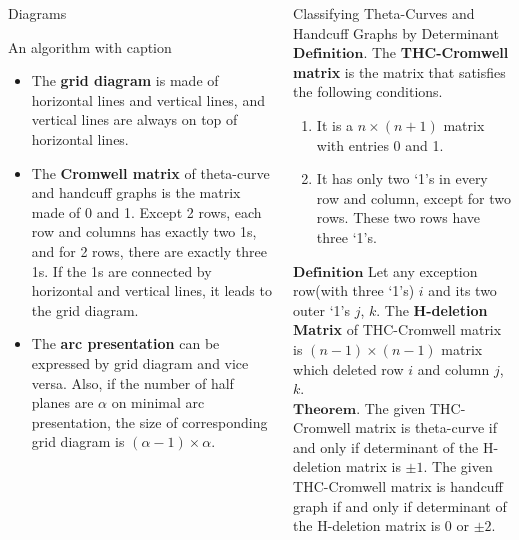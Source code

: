 \documentclass[final]{beamer}
\begin{document}
\begin{frame}[t]
\begin{columns}[t]
\begin{block}{Diagrams}
    \begin{Diagrams}
      \caption{An algorithm with caption}\label{alg:cap}
      \begin{itemize} 
        \item The \textbf{grid diagram} is made of horizontal lines and vertical lines, and vertical lines are always on top of horizontal lines.
        \item The \textbf{Cromwell matrix} of theta-curve and handcuff graphs is the matrix made of 0 and 1.
        Except 2 rows, each row and columns has exactly two 1s, and for 2 rows, there are exactly three 1s.
        If the 1s are connected by horizontal and vertical lines, it leads to the grid diagram.
        \item The \textbf{arc presentation} can be expressed by grid diagram and vice versa.
        Also, if the number of half planes are $\alpha$ on minimal arc presentation, the size of corresponding grid diagram is $(\alpha - 1) \times \alpha$.\\
      \end{itemize} 
    \end{Diagrams}

  \end{block}
  \begin{block}{Classifying Theta-Curves and Handcuff Graphs by Determinant}
    $\mathbf{Definition.}$ The \textbf{THC-Cromwell matrix} is the matrix that satisfies the following conditions.
    \begin{enumerate}
      \item It is a $n\times(n+1)$ matrix with entries 0 and 1.
      \item It has only two `1's in every row and column, except for two rows. These two rows have three `1's.
    \end{enumerate}
    $\mathbf{Definition}$ Let any exception row(with three `1's) $i$ and its two outer `1's $j$, $k$.
    The \textbf{H-deletion Matrix} of THC-Cromwell matrix is $(n-1)\times(n-1)$ matrix which deleted row $i$ and column $j$, $k$.\\
    $\mathbf{Theorem.}$ The given THC-Cromwell matrix is theta-curve if and only if determinant of the H-deletion matrix is $\pm 1$.
    The given THC-Cromwell matrix is handcuff graph if and only if determinant of the H-deletion matrix is $0$ or $\pm 2$.\\
  \end{block}
\end{columns}


\end{frame}
\end{document}
